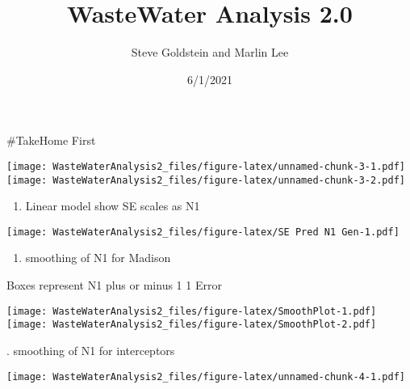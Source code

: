 \documentclass[
]{article}
\title{WasteWater Analysis 2.0}
\author{Steve Goldstein and Marlin Lee}
\date{6/1/2021}
\providecommand{\tightlist}{%
  \setlength{\itemsep}{0pt}\setlength{\parskip}{0pt}}
\begin{document}
\maketitle

\#TakeHome First

\texttt{[image: WasteWaterAnalysis2\_files/figure-latex/unnamed-chunk-3-1.pdf]}
\texttt{[image: WasteWaterAnalysis2\_files/figure-latex/unnamed-chunk-3-2.pdf]}

\begin{enumerate}
\def\labelenumi{\arabic{enumi}.}
\tightlist
\item
  Linear model show SE scales as N1
\end{enumerate}

\texttt{[image: WasteWaterAnalysis2\_files/figure-latex/SE Pred N1 Gen-1.pdf]}

\begin{enumerate}
\def\labelenumi{\arabic{enumi}.}
\setcounter{enumi}{1}
\tightlist
\item
  smoothing of N1 for Madison
\end{enumerate}

Boxes represent N1 plus or minus 1 1 Error

\texttt{[image: WasteWaterAnalysis2\_files/figure-latex/SmoothPlot-1.pdf]}
\texttt{[image: WasteWaterAnalysis2\_files/figure-latex/SmoothPlot-2.pdf]}

. smoothing of N1 for interceptors

\texttt{[image: WasteWaterAnalysis2\_files/figure-latex/unnamed-chunk-4-1.pdf]}
\end{document}
